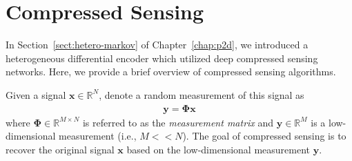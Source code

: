 \chapter{Compressed Sensing}
\label{appdx:compressed-sensing}

In Section~\ref{sect:hetero-markov} of Chapter~\ref{chap:p2d}, we introduced a heterogeneous differential encoder which utilized deep compressed sensing networks. Here, we provide a brief overview of compressed sensing algorithms.

Given a signal $\mathbf{x}\in\mathbb{R}^N$, denote a random measurement of this signal as 
\begin{align*}
    \mathbf{y} = \mathbf{\Phi}\mathbf{x}
\end{align*}
where $\mathbf{\Phi}\in\mathbb{R}^{M\times N}$ is referred to as the \emph{measurement matrix} and $\mathbf{y}\in\mathbb{R}^{M}$ is a low-dimensional measurement (i.e., $M << N$). The goal of compressed sensing is to recover the original signal $\mathbf{x}$ based on the low-dimensional measurement $\mathbf{y}$.